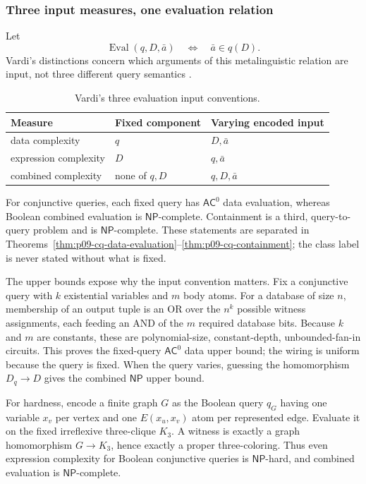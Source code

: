 \subsubsection{Three input measures, one evaluation relation}

Let
\[
 \operatorname{Eval}(q,D,\bar a)
 \quad\Longleftrightarrow\quad
 \bar a\in q(D).
\]
Vardi's distinctions concern which arguments of this metalinguistic relation
are input, not three different query semantics \cite[pp.~137--139]{Vardi1982}.

\begin{table}[htbp]
\centering\small
\begin{tabularx}{\textwidth}{@{}l X X@{}}
\toprule
Measure & Fixed component & Varying encoded input \\
\midrule
data complexity & \(q\) & \(D,\bar a\) \\
expression complexity & \(D\) & \(q,\bar a\) \\
combined complexity & none of \(q,D\) & \(q,D,\bar a\) \\
\bottomrule
\end{tabularx}
\caption{Vardi's three evaluation input conventions.}
\label{tab:p09-query-input-measures}
\end{table}

For conjunctive queries, each fixed query has
\(\mathsf{AC}^{0}\) data evaluation, whereas Boolean combined evaluation is
\(\mathsf{NP}\)-complete.  Containment is a third, query-to-query problem and is
\(\mathsf{NP}\)-complete.  These statements are separated in
Theorems~\ref{thm:p09-cq-data-evaluation}--\ref{thm:p09-cq-containment};
the class label is never stated without what is fixed.

The upper bounds expose why the input convention matters.  Fix a conjunctive
query with \(k\) existential variables and \(m\) body atoms.  For a database of
size \(n\), membership of an output tuple is an OR over the \(n^k\) possible
witness assignments, each feeding an AND of the \(m\) required database bits.
Because \(k\) and \(m\) are constants, these are polynomial-size,
constant-depth, unbounded-fan-in circuits.  This proves the fixed-query
\(\mathsf{AC}^{0}\) data upper bound; the wiring is uniform because the query
is fixed.  When the query varies, guessing the
homomorphism \(D_q\to D\) gives the combined \(\mathsf{NP}\) upper bound.

For hardness, encode a finite graph \(G\) as the Boolean query \(q_G\) having
one variable \(x_v\) per vertex and one \(E(x_u,x_v)\) atom per represented
edge.  Evaluate it on the fixed irreflexive three-clique \(K_3\).  A witness is
exactly a graph homomorphism \(G\to K_3\), hence exactly a proper
three-coloring.  Thus even expression complexity for Boolean conjunctive
queries is \(\mathsf{NP}\)-hard, and combined evaluation is
\(\mathsf{NP}\)-complete.

